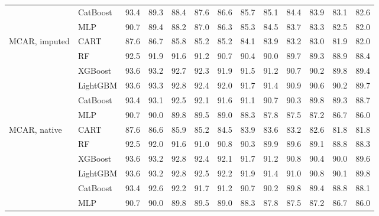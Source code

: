 \documentclass[pdflatex,sn-mathphys]{sn-jnl}
\theoremstyle{thmstyleone}
\begin{document}
\begin{table}[htbp]
\begin{tabular}{@{}llrrrrrrrrrrr@{}}
 & CatBoost & 93.4 & 89.3 & 88.4 & 87.6 & 86.6 & 85.7 & 85.1 & 84.4 & 83.9 & 83.1 & 82.6 \\
 & MLP & 90.7 & 89.4 & 88.2 & 87.0 & 86.3 & 85.3 & 84.5 & 83.7 & 83.3 & 82.5 & 82.0 \\
\midrule
MCAR, imputed & CART & 87.6 & 86.7 & 85.8 & 85.2 & 85.2 & 84.1 & 83.9 & 83.2 & 83.0 & 81.9 & 82.0 \\
 & RF & 92.5 & 91.9 & 91.6 & 91.2 & 90.7 & 90.4 & 90.0 & 89.7 & 89.3 & 88.9 & 88.4 \\
 & XGBoost & 93.6 & 93.2 & 92.7 & 92.3 & 91.9 & 91.5 & 91.2 & 90.7 & 90.2 & 89.8 & 89.4 \\
 & LightGBM & 93.6 & 93.3 & 92.8 & 92.4 & 92.0 & 91.7 & 91.4 & 90.9 & 90.6 & 90.2 & 89.7 \\
 & CatBoost & 93.4 & 93.1 & 92.5 & 92.1 & 91.6 & 91.1 & 90.7 & 90.3 & 89.8 & 89.3 & 88.7 \\
 & MLP & 90.7 & 90.0 & 89.8 & 89.5 & 89.0 & 88.3 & 87.8 & 87.5 & 87.2 & 86.7 & 86.0 \\
\midrule
MCAR, native & CART & 87.6 & 86.6 & 85.9 & 85.2 & 84.5 & 83.9 & 83.6 & 83.2 & 82.6 & 81.8 & 81.8 \\
 & RF & 92.5 & 92.0 & 91.6 & 91.0 & 90.8 & 90.3 & 89.9 & 89.6 & 89.1 & 88.8 & 88.3 \\
 & XGBoost & 93.6 & 93.2 & 92.8 & 92.4 & 92.1 & 91.7 & 91.2 & 90.8 & 90.4 & 90.0 & 89.6 \\
 & LightGBM & 93.6 & 93.2 & 92.8 & 92.5 & 92.2 & 91.9 & 91.4 & 91.0 & 90.8 & 90.1 & 89.8 \\
 & CatBoost & 93.4 & 92.6 & 92.2 & 91.7 & 91.2 & 90.7 & 90.2 & 89.8 & 89.4 & 88.8 & 88.1 \\
 & MLP & 90.7 & 90.0 & 89.8 & 89.5 & 89.0 & 88.3 & 87.8 & 87.5 & 87.2 & 86.7 & 86.0 \\
\bottomrule
\end{tabular}
\end{table}
\end{document}
